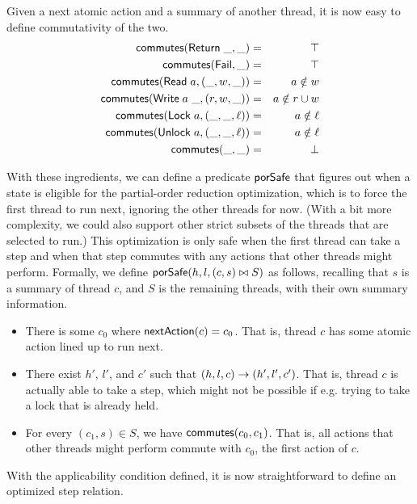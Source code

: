 \documentclass{amsbook}
\theoremstyle{definition}
\theoremstyle{remark}
\numberwithin{section}{chapter}
\numberwithin{equation}{chapter}
\begin{document}
Given a next atomic action and a summary of another thread, it is now easy to define commutativity of the two.
\newcommand{\commu}[2]{\mt{commutes}(#1, #2)}
\begin{eqnarray*}
  \commu{\mt{Return} \; \_}{\_} &=& \top \\
  \commu{\mt{Fail}}{\_} &=& \top \\
  \commu{\mt{Read} \; a}{(\_, w, \_)} &=& a \notin w \\
  \commu{\mt{Write} \; a \; \_}{(r, w, \_)} &=& a \notin r \cup w \\
  \commu{\mt{Lock} \; a}{(\_, \_, \ell)} &=& a \notin \ell \\
  \commu{\mt{Unlock} \; a}{(\_, \_, \ell)} &=& a \notin \ell \\
  \commu{\_}{\_} &=& \bot
\end{eqnarray*}

\newcommand{\pors}[1]{\mt{porSafe}(#1)}

With these ingredients, we can define a predicate $\mathsf{porSafe}$ that figures out when a state is eligible for the partial-order reduction optimization, which is to force the first thread to run next, ignoring the other threads for now.
(With a bit more complexity, we could also support other strict subsets of the threads that are selected to run.)
This optimization is only safe when the first thread can take a step and when that step commutes with any actions that other threads might perform.
Formally, we define $\pors{h, l, \concat{(c, s)}{S}}$ as follows, recalling that $s$ is a summary of thread $c$, and $S$ is the remaining threads, with their own summary information.
\begin{itemize}
\item There is some $c_0$ where $\mathsf{nextAction}(c) = c_0$.  That is, thread $c$ has some atomic action lined up to run next.
\item There exist $h'$, $l'$, and $c'$ such that $(h, l, c) \to (h', l', c')$.  That is, thread $c$ is actually able to take a step, which might not be possible if e.g. trying to take a lock that is already held.
\item For every $(c_1, s) \in S$, we have $\commu{c_0}{c_1}$.  That is, all actions that other threads might perform commute with $c_0$, the first action of $c$.
\end{itemize}

\newcommand{\smallstepC}[2]{#1 \to_C #2}

With the applicability condition defined, it is now straightforward to define an optimized step relation.
\end{document}
